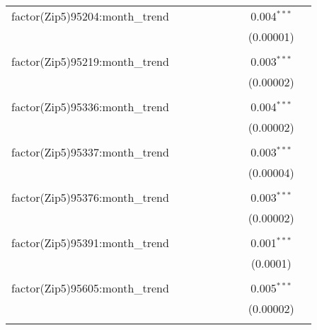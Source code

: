 \begin{table}[H]
{\begin{tabular}{@{\extracolsep{5pt}}lcccccccc}
  factor(Zip5)95204:month\_trend &  &  &  &  &  &  & 0.004$^{***}$ &  \\  

   &  &  &  &  &  &  & (0.00001) &  \\  

   & & & & & & & & \\  

  factor(Zip5)95219:month\_trend &  &  &  &  &  &  & 0.003$^{***}$ &  \\  

   &  &  &  &  &  &  & (0.00002) &  \\  

   & & & & & & & & \\  

  factor(Zip5)95336:month\_trend &  &  &  &  &  &  & 0.004$^{***}$ &  \\  

   &  &  &  &  &  &  & (0.00002) &  \\  

   & & & & & & & & \\  

  factor(Zip5)95337:month\_trend &  &  &  &  &  &  & 0.003$^{***}$ &  \\  

   &  &  &  &  &  &  & (0.00004) &  \\  

   & & & & & & & & \\  

  factor(Zip5)95376:month\_trend &  &  &  &  &  &  & 0.003$^{***}$ &  \\  

   &  &  &  &  &  &  & (0.00002) &  \\  

   & & & & & & & & \\  

  factor(Zip5)95391:month\_trend &  &  &  &  &  &  & 0.001$^{***}$ &  \\  

   &  &  &  &  &  &  & (0.0001) &  \\  

   & & & & & & & & \\  

  factor(Zip5)95605:month\_trend &  &  &  &  &  &  & 0.005$^{***}$ &  \\  

   &  &  &  &  &  &  & (0.00002) &  \\  

   & & & & & & & & \\  


\end{tabular}}
\end{table}

